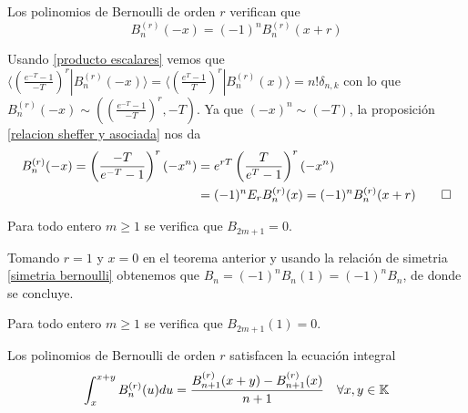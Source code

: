 \begin{teorema}
    Los polinomios de Bernoulli de orden $r$ verifican que 
    \begin{equation*}
        B_n^{(r)}(-x) = (-1)^n B_n^{(r)}(x + r)
    \end{equation*}
\end{teorema}

\begin{demo}
    Usando \ref{producto escalares} vemos que $\langle (\frac{e^{-T} - 1}{-T})^r| B_n^{(r)}(-x)\rangle = \langle (\frac{e^{T} - 1}{T})^r| B_n^{(r)}(x)\rangle = n! \delta_{n,k}$ con lo que $B_n^{(r)}(-x) \sim ((\frac{e^{-T} - 1}{-T})^r, -T)$. Ya que $(-x)^n \sim (-T)$, la proposición \ref{relacion sheffer y asociada} nos da
    \begin{align*}
        B_n^{(r)}(-x) = \left(\frac{-T}{e^{-T} - 1}\right)^r (-x^n) & = e^{r T} \left(\frac{T}{e^T - 1}\right)^r (-x^n) \\
        & = (-1)^n E_r B_n^{(r)}(x) = (-1)^n B_n^{(r)}(x + r) \qedhere
    \end{align*}
\end{demo}

\begin{corolario}
    Para todo entero $m \geq 1$ se verifica que $B_{2m + 1} = 0$. 
\end{corolario}

\begin{demo}
    Tomando $r=1$ y $x=0$ en el teorema anterior y usando la relación de simetria \ref{simetria bernoulli} obtenemos que $B_n = (-1)^n B_n(1) = (-1)^n B_n$, de donde se concluye.
\end{demo}

\begin{corolario}
    Para todo entero $m \geq 1$ se verifica que $B_{2m + 1}(1) = 0$. 
\end{corolario}

\begin{proposicion}\label{caracterizacion integral bernoulli}
    Los polinomios de Bernoulli de orden $r$ satisfacen la ecuación integral
    \begin{equation*}
        \int_{x}^{x + y} B_n^{(r)}(u) du = \frac{B_{n+1}^{(r)}(x + y) - B_{n+1}^{(r)}(x)}{n+1} \quad \forall x,y \in \mathbb{K}
    \end{equation*}
\end{proposicion}

